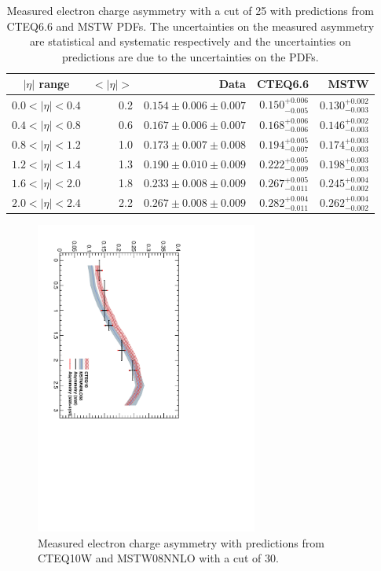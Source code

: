 \begin{table}[htbp]
\begin{center}
\begin{tabular}{crrrr}
    \toprule
$|\eta|$ range & $<|\eta|>$ & Data & CTEQ6.6 & MSTW \\
\midrule 
$0.0<|\eta|<0.4$ & 0.2 & $0.154\pm0.006\pm0.007$ & $0.150^{+0.006}_{-0.005}$ & $0.130^{+0.002}_{-0.003}$\\
$0.4<|\eta|<0.8$ & 0.6 & $0.167\pm0.006\pm0.007$ & $0.168^{+0.006}_{-0.006}$ & $0.146^{+0.002}_{-0.003}$\\
$0.8<|\eta|<1.2$ & 1.0 & $0.173\pm0.007\pm0.008$ & $0.194^{+0.005}_{-0.007}$ & $0.174^{+0.003}_{-0.003}$\\
$1.2<|\eta|<1.4$ & 1.3 & $0.190\pm0.010\pm0.009$ & $0.222^{+0.005}_{-0.009}$ & $0.198^{+0.003}_{-0.003}$\\
$1.6<|\eta|<2.0$ & 1.8 & $0.233\pm0.008\pm0.009$ & $0.267^{+0.005}_{-0.011}$ & $0.245^{+0.004}_{-0.002}$\\
$2.0<|\eta|<2.4$ & 2.2 & $0.267\pm0.008\pm0.009$ & $0.282^{+0.004}_{-0.011}$ & $0.262^{+0.004}_{-0.002}$\\
    \bottomrule
\end{tabular}
\caption{Measured electron charge asymmetry with a \pT cut of \unit{25}{\GeV}
with predictions from CTEQ6.6 and MSTW PDFs.  The uncertainties on the measured
asymmetry are statistical and systematic respectively and the uncertainties on
predictions are due to the uncertainties on the PDFs\cite{baisini2010electron}.}
\label{tab:results25}
\end{center}
\end{table}


\begin{figure}[htbp]
  \begin{center}
  \includegraphics*[width=0.65\textwidth,angle=90]{Asym_30}
  \caption{\label{fig:asym30} Measured electron charge asymmetry with
predictions from CTEQ10W and MSTW08NNLO with a \pT cut of \unit{30}{\GeV}\cite{baisini2010electron}.}
  \end{center}
\end{figure}

